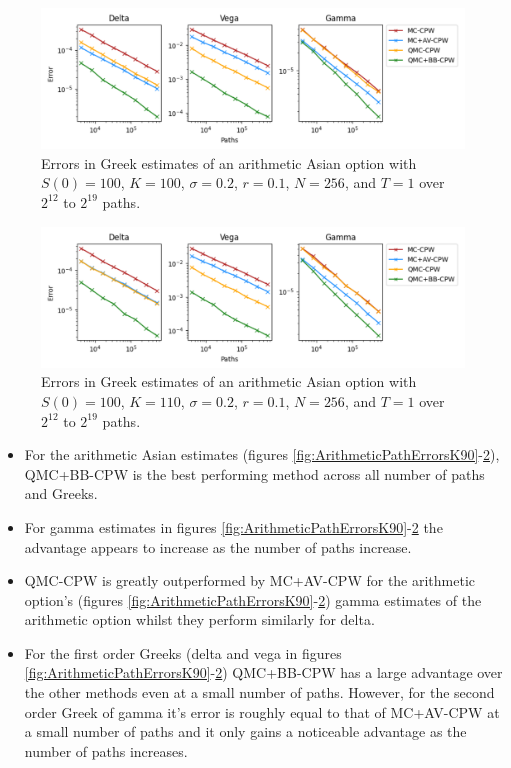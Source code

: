 \begin{figure}[H]
    \centering
    \includegraphics[width=1\textwidth]{figures/arithmetic path errors k=100.pdf}
    \caption{Errors in Greek estimates of an arithmetic Asian option with $S(0)=100$, $K=100$, $\sigma = 0.2$, $r=0.1$, $N=256$, and $T=1$ over $2^{12}$ to $2^{19}$ paths.}
    \label{fig:ArithmeticPathErrorsK100}
\end{figure}

\begin{figure}[H]
    \centering
    \includegraphics[width=1\textwidth]{figures/arithmetic path errors k=110.pdf}
    \caption{Errors in Greek estimates of an arithmetic Asian option with $S(0)=100$, $K=110$, $\sigma = 0.2$, $r=0.1$, $N=256$, and $T=1$ over $2^{12}$ to $2^{19}$ paths.}
    \label{fig:ArithmeticPathErrorsK110}
\end{figure}

\begin{itemize}
    \item For the arithmetic Asian estimates (figures \ref{fig:ArithmeticPathErrorsK90}-\ref{fig:ArithmeticPathErrorsK110}), QMC+BB-CPW is the best performing method across all number of paths and Greeks.
    \item For gamma estimates in figures \ref{fig:ArithmeticPathErrorsK90}-\ref{fig:ArithmeticPathErrorsK110} the advantage appears to increase as the number of paths increase.
    \item QMC-CPW is greatly outperformed by MC+AV-CPW for the arithmetic option's (figures \ref{fig:ArithmeticPathErrorsK90}-\ref{fig:ArithmeticPathErrorsK110}) gamma estimates of the arithmetic option whilst they perform similarly for delta.
    \item For the first order Greeks (delta and vega in figures \ref{fig:ArithmeticPathErrorsK90}-\ref{fig:ArithmeticPathErrorsK110}) QMC+BB-CPW has a large advantage over the other methods even at a small number of paths. However, for the second order Greek of gamma it's error is roughly equal to that of MC+AV-CPW at a small number of paths and it only gains a noticeable advantage as the number of paths increases.
\end{itemize}

